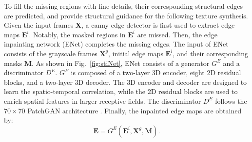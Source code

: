 To fill the missing regions with fine details, their corresponding structural edges are predicted, and provide structural guidance for the following texture synthesis.
%
Given the input frames $\boldsymbol{X}$, a canny edge detector is first used to extract edge maps $\boldsymbol{E}^{i}$. Notably, the masked regions in $\boldsymbol{E}^{i}$ are missed. 
Then, the edge inpainting network (ENet) completes the missing edges.
The input of ENet consists of the grayscale frames $\boldsymbol{X}^{g}$, initial edge maps $\boldsymbol{E}^{i}$, and their corresponding masks $\boldsymbol{M}$.
%
As shown in Fig.~\ref{fig:stiNet}, ENet consists of a generator $G^E$ and a discriminator $D^E$.
$G^E$ is composed of a two-layer 3D encoder, eight 2D residual blocks, and a two-layer 3D decoder. 
The 3D encoder and decoder are designed to learn the spatio-temporal correlation, while the 2D residual blocks are used to enrich spatial features in larger receptive fields. The discriminator $D^E$ follows the $70\times 70$ PatchGAN architecture \cite{Isola_2017_CVPR}. 
Finally, the inpainted edge maps are obtained by:
\begin{equation}
\label{eq:edgenet}
\boldsymbol{E}=G^E(\boldsymbol{E}^{i},\boldsymbol{X}^{g},\boldsymbol{M}).
\end{equation}

